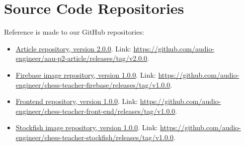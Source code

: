 \chapter{Source Code Repositories}\label{ch:source-code-repositories}

Reference is made to our GitHub repositories:

\begin{itemize}
    \item \href{https://github.com/audio-engineer/aau-p2-article/releases/tag/v2.0.0}
    {Article repository, version 2.0.0}.
    Link: \url{https://github.com/audio-engineer/aau-p2-article/releases/tag/v2.0.0}.
    \item \href{https://github.com/audio-engineer/chess-teacher-firebase/releases/tag/v1.0.0}
    {Firebase image repository, version 1.0.0}.
    Link: \url{https://github.com/audio-engineer/chess-teacher-firebase/releases/tag/v1.0.0}.
    \item \href{https://github.com/audio-engineer/chess-teacher-front-end/releases/tag/v1.0.0}
    {Frontend repository, version 1.0.0}.
    Link: \url{https://github.com/audio-engineer/chess-teacher-front-end/releases/tag/v1.0.0}.
    \item \href{https://github.com/audio-engineer/chess-teacher-stockfish/releases/tag/v1.0.0}
    {Stockfish image repository, version 1.0.0}.
    Link: \url{https://github.com/audio-engineer/chess-teacher-stockfish/releases/tag/v1.0.0}.
\end{itemize}
